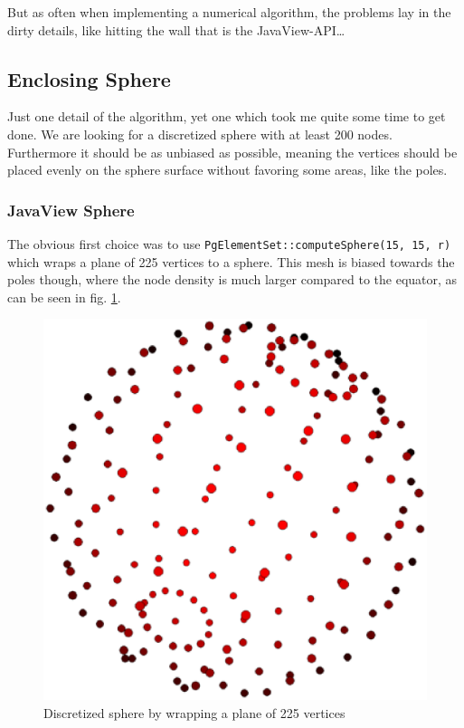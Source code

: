 \documentclass[a4paper,10pt,notitlepage]{scrreprt}
\begin{document}
But as often when implementing a numerical algorithm, the problems lay in the
dirty details, like hitting the wall that is the JavaView-API\dots

\subsection{Enclosing Sphere}

Just one detail of the algorithm, yet one which took me quite some time to get
done. We are looking for a discretized sphere with at least 200 nodes.
Furthermore it should be as unbiased as possible, meaning the vertices should
be placed evenly on the sphere surface without favoring some areas, like the
poles.

\subsubsection{JavaView Sphere}

The obvious first choice was to use \texttt{PgElementSet::computeSphere(15,
15, r)} which wraps a plane of 225 vertices to a sphere. This mesh is biased
towards the poles though, where the node density is much larger compared to the
equator, as can be seen in fig. \ref{fig:grid-sphere}.

\begin{figure}
 \centering
 \includegraphics[scale=0.5]{sphere-grid.eps}
 \caption{Discretized sphere by wrapping a plane of 225 vertices}
 \label{fig:grid-sphere}
\end{figure}
\end{document}
